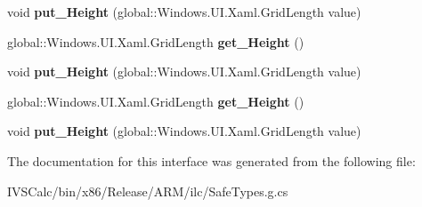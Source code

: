 \begin{DoxyCompactItemize}
\item 
\mbox{\label{interface_windows_1_1_u_i_1_1_xaml_1_1_controls_1_1_i_row_definition_a86970b3726ca9461fb38040164d3ebdd}} 
void {\bfseries put\+\_\+\+Height} (global\+::\+Windows.\+U\+I.\+Xaml.\+Grid\+Length value)
\item 
\mbox{\label{interface_windows_1_1_u_i_1_1_xaml_1_1_controls_1_1_i_row_definition_a59da0b59c797fb8c8172aacf08bbc676}} 
global\+::\+Windows.\+U\+I.\+Xaml.\+Grid\+Length {\bfseries get\+\_\+\+Height} ()
\item 
\mbox{\label{interface_windows_1_1_u_i_1_1_xaml_1_1_controls_1_1_i_row_definition_a86970b3726ca9461fb38040164d3ebdd}} 
void {\bfseries put\+\_\+\+Height} (global\+::\+Windows.\+U\+I.\+Xaml.\+Grid\+Length value)
\item 
\mbox{\label{interface_windows_1_1_u_i_1_1_xaml_1_1_controls_1_1_i_row_definition_a59da0b59c797fb8c8172aacf08bbc676}} 
global\+::\+Windows.\+U\+I.\+Xaml.\+Grid\+Length {\bfseries get\+\_\+\+Height} ()
\item 
\mbox{\label{interface_windows_1_1_u_i_1_1_xaml_1_1_controls_1_1_i_row_definition_a86970b3726ca9461fb38040164d3ebdd}} 
void {\bfseries put\+\_\+\+Height} (global\+::\+Windows.\+U\+I.\+Xaml.\+Grid\+Length value)
\end{DoxyCompactItemize}


The documentation for this interface was generated from the following file\+:\begin{DoxyCompactItemize}
\item 
I\+V\+S\+Calc/bin/x86/\+Release/\+A\+R\+M/ilc/Safe\+Types.\+g.\+cs\end{DoxyCompactItemize}
